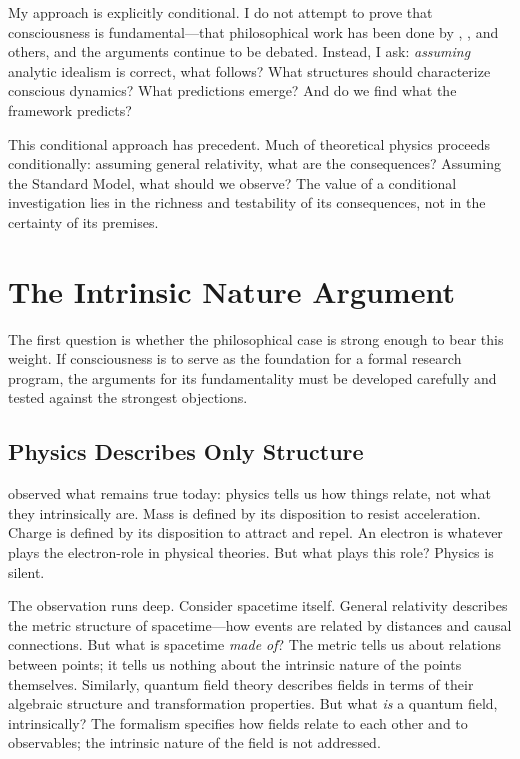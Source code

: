 \documentclass[11pt,a4paper]{article}
\theoremstyle{definition}
\theoremstyle{plain}
\theoremstyle{remark}
\begin{document}
My approach is explicitly conditional. I do not attempt to prove that consciousness is fundamental---that philosophical work has been done by \citet{Kastrup2019}, \citet{Goff2017}, and others, and the arguments continue to be debated. Instead, I ask: \textit{assuming} analytic idealism is correct, what follows? What structures should characterize conscious dynamics? What predictions emerge? And do we find what the framework predicts?

This conditional approach has precedent. Much of theoretical physics proceeds conditionally: assuming general relativity, what are the consequences? Assuming the Standard Model, what should we observe? The value of a conditional investigation lies in the richness and testability of its consequences, not in the certainty of its premises.

\section{The Intrinsic Nature Argument}\label{sec:intrinsic}

The first question is whether the philosophical case is strong enough to bear this weight. If consciousness is to serve as the foundation for a formal research program, the arguments for its fundamentality must be developed carefully and tested against the strongest objections.

\subsection{Physics Describes Only Structure}\label{sec:structure}

\citet{Russell1927} observed what remains true today: physics tells us how things relate, not what they intrinsically are. Mass is defined by its disposition to resist acceleration. Charge is defined by its disposition to attract and repel. An electron is whatever plays the electron-role in physical theories. But what plays this role? Physics is silent.

The observation runs deep. Consider spacetime itself. General relativity describes the metric structure of spacetime---how events are related by distances and causal connections. But what is spacetime \textit{made of}? The metric tells us about relations between points; it tells us nothing about the intrinsic nature of the points themselves. Similarly, quantum field theory describes fields in terms of their algebraic structure and transformation properties. But what \textit{is} a quantum field, intrinsically? The formalism specifies how fields relate to each other and to observables; the intrinsic nature of the field is not addressed.
\end{document}
